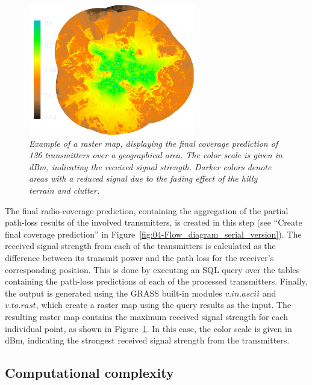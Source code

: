 \begin{figure}
\centering

\includegraphics[width=0.65\textwidth]{04-framework_design_and_implementation/img/final_coverage}

\caption{\textit{\emph{Example of a raster map, displaying the final coverage
prediction of 136 transmitters over a geographical area. The color
scale is given in dBm, indicating the received signal strength. Darker
colors denote areas with a reduced signal due to the fading effect
of the hilly terrain and clutter. \label{fig:04-Raster_prediction_example}}}}
\end{figure}


The final radio-coverage prediction, containing the aggregation of
the partial path-loss results of the involved transmitters, is created
in this step (see ``Create final coverage prediction'' in Figure~\ref{fig:04-Flow_diagram_serial_version}).
The received signal strength from each of the transmitters is calculated
as the difference between its transmit power and the path loss for
the receiver's corresponding position. This is done by executing an
SQL query over the tables containing the path-loss predictions of
each of the processed transmitters. Finally, the output is generated
using the GRASS built-in modules $v.in.ascii$ and $v.to.rast$, which
create a raster map using the query results as the input. The resulting
raster map contains the maximum received signal strength for each
individual point, as shown in Figure~\ref{fig:04-Raster_prediction_example}.
In this case, the color scale is given in dBm, indicating the strongest
received signal strength from the transmitters.


\subsection{Computational complexity \label{sub:04-Computational_complexity}}

